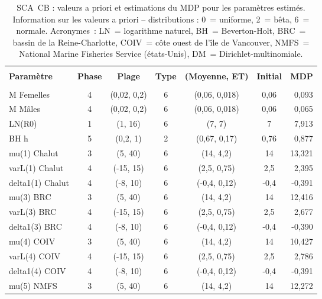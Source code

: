 \newpage
{}

\setlength{\tabcolsep}{2pt}
\begin{table}[!h]
\centering
\caption{SCA~CB : valeurs a priori et estimations du MDP pour les param\`{e}tres estim\'{e}s. Information sur les valeurs a priori -- distributions : 0~= uniforme, 2~= b\^{e}ta, 6~= normale. Acronymes~: LN~= logarithme naturel, BH~= Beverton-Holt, BRC~= bassin de la Reine-Charlotte, COIV~= c\^{o}te ouest de l'\^{i}le de Vancouver, NMFS~= National Marine Fisheries Service (\'{e}tats-Unis), DM~= Dirichlet-multinomiale.}
\label{tab:car.parest}
\usefont{\encodingdefault}{\familydefault}{\seriesdefault}{\shapedefault}\small
\begin{tabular}{lcccccr}
\hline \\ [-1.5ex]
{\bf Param\`{e}tre} & {\bf Phase} & {\bf Plage} & {\bf Type} & {\bf (Moyenne, ET)} & {\bf Initial} & {\bf MDP} \\ [1ex]
\hline \\ [-1.5ex]
M Femelles & 4 & (0,02, 0,2) & 6 & (0,06, 0,018) & 0,06 & 0,093 \\
M M\^{a}les & 4 & (0,02, 0,2) & 6 & (0,06, 0,018) & 0,06 & 0,065 \\
LN(R0) & 1 & (1, 16) & 6 & (7, 7) & 7 & 7,913 \\
BH h & 5 & (0,2, 1) & 2 & (0,67, 0,17) & 0,76 & 0,877 \\
mu(1) Chalut & 3 & (5, 40) & 6 & (14, 4,2) & 14 & 13,321 \\
varL(1) Chalut & 4 & (-15, 15) & 6 & (2,5, 0,75) & 2,5 & 2,395 \\
delta1(1) Chalut & 4 & (-8, 10) & 6 & (-0,4, 0,12) & -0,4 & -0,391 \\
mu(3) BRC & 3 & (5, 40) & 6 & (14, 4,2) & 14 & 12,416 \\
varL(3) BRC & 4 & (-15, 15) & 6 & (2,5, 0,75) & 2,5 & 2,677 \\
delta1(3) BRC & 4 & (-8, 10) & 6 & (-0,4, 0,12) & -0,4 & -0,390 \\
mu(4) COIV & 3 & (5, 40) & 6 & (14, 4,2) & 14 & 10,427 \\
varL(4) COIV & 4 & (-15, 15) & 6 & (2,5, 0,75) & 2,5 & 2,786 \\
delta1(4) COIV & 4 & (-8, 10) & 6 & (-0,4, 0,12) & -0,4 & -0,391 \\
mu(5) NMFS & 3 & (5, 40) & 6 & (14, 4,2) & 14 & 12,272 \\

\end{tabular}
\end{table}
